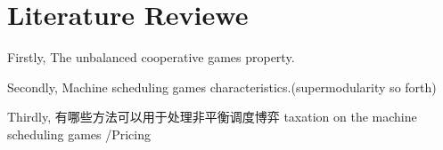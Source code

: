 \section{Literature Reviewe}
\cite{caprara2010new}
\cite{liu2018simultaneous}
\cite{schulz2010sharing}
\cite{bachrach2009cost}
\cite{bondareva1963some}
\cite{cai2012coordination}
\cite{goemans2004cooperative}
\cite{aydinliyim2010coordination}
\cite{curiel1989sequencing}
\cite{jain2007cost}
\cite{liu2009complexity}
\cite{liu2016computing}

Firstly, The unbalanced cooperative games property.

Secondly, Machine scheduling games characteristics.(supermodularity so forth)

Thirdly, 有哪些方法可以用于处理非平衡调度博弈
taxation on the machine scheduling games /Pricing
